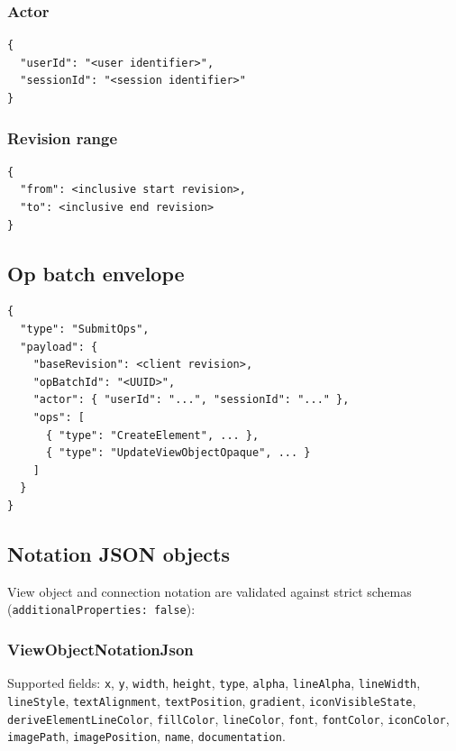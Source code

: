 \subsubsection{Actor}

\begin{lstlisting}[caption={Actor object}]
{
  "userId": "<user identifier>",
  "sessionId": "<session identifier>"
}
\end{lstlisting}

\subsubsection{Revision range}

\begin{lstlisting}[caption={Revision range object}]
{
  "from": <inclusive start revision>,
  "to": <inclusive end revision>
}
\end{lstlisting}

\subsection{Op batch envelope}

\begin{lstlisting}[caption={SubmitOps payload}]
{
  "type": "SubmitOps",
  "payload": {
    "baseRevision": <client revision>,
    "opBatchId": "<UUID>",
    "actor": { "userId": "...", "sessionId": "..." },
    "ops": [
      { "type": "CreateElement", ... },
      { "type": "UpdateViewObjectOpaque", ... }
    ]
  }
}
\end{lstlisting}

\subsection{Notation JSON objects}

View object and connection notation are validated against strict schemas
(\texttt{additionalProperties: false}):

\subsubsection{ViewObjectNotationJson}

Supported fields: \texttt{x}, \texttt{y}, \texttt{width}, \texttt{height},
\texttt{type}, \texttt{alpha}, \texttt{lineAlpha}, \texttt{lineWidth},
\texttt{lineStyle}, \texttt{textAlignment}, \texttt{textPosition},
\texttt{gradient}, \texttt{iconVisibleState},
\texttt{deriveElementLineColor}, \texttt{fillColor}, \texttt{lineColor},
\texttt{font}, \texttt{fontColor}, \texttt{iconColor},
\texttt{imagePath}, \texttt{imagePosition}, \texttt{name},
\texttt{documentation}.

